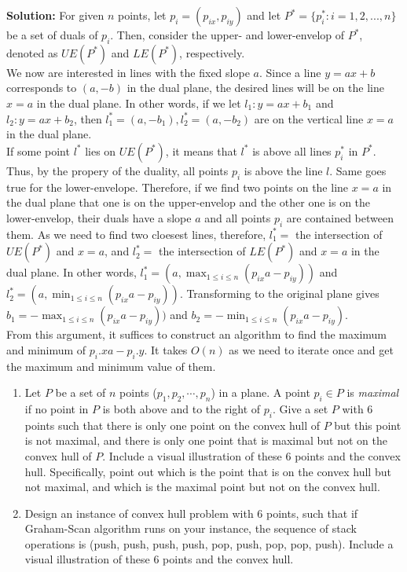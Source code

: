\documentclass[11pt]{article}
\begin{document}
\begin{qunlist}
{\bf Solution:} For given $n$ points, let $p_i = (p_{ix}, p_{iy})$ and let $P^* =
\{p_i^* : i = 1, 2, ..., n\}$ be a set of duals of $p_i$. Then, consider the
upper- and lower-envelop of $P^*$, denoted as $UE(P^*)$ and $LE(P^*)$,
	respectively. \\ We now are interested in lines with the fixed slope $a$.
	Since a line $y = ax + b$ corresponds to $(a, -b)$ in the dual plane, the
	desired lines will be on the line $x = a$ in the dual plane. In other
	words, if we let $l_1 : y = ax + b_1$ and $l_2 : y = ax + b_2$, then $l_1^*
	= (a, -b_1), l_2^* = (a, -b_2)$ are on the vertical line $x = a$ in the
	dual plane.\\ If some point $l^*$ lies on $UE(P^*)$, it means that $l^*$ is
	above all lines $p_i^*$ in $P^*$. Thus, by the propery of the duality, all
	points $p_i$ is above the line $l$. Same goes true for the lower-envelope.
	Therefore, if we find two points on the line $x=a$ in the dual plane that
	one is on the upper-envelop and the other one is on the lower-envelop,
	their duals have a slope $a$ and all points $p_i$ are contained between
	them. As we need to find two cloesest lines, therefore, $l_1^* =$ the
	intersection of $UE(P^*)$ and $x=a$, and $l_2^* =$ the intersection of
	$LE(P^*)$ and $x=a$ in the dual plane. In other words, $l_1^* = (a,
			\max_{1\leq i \leq n}(p_{ix} a - p_{iy}))$ and $l_2^* = (a,
			\min_{1\leq i \leq n}(p_{ix} a - p_{iy}))$. Transforming to the
			original plane gives $b_1 = -\max_{1\leq i \leq n}(p_{ix} a -
					p_{iy}))$ and $b_2 = -\min_{1\leq i \leq n}(p_{ix} a -
					p_{iy})$.\\ From this argument, it suffices to construct an
					algorithm to find the maximum and minimum of $p_i.x a -
					p_i.y$. It takes $O(n)$ as we need to iterate once and get
					the maximum and minimum value of them.

\begin{enumerate}
\item Let $P$ be a set of $n$ points ($p_1, p_2, \cdots, p_n$) in a plane. A point
$p_i \in P$ is \emph{maximal} if no point in $P$ is both above and to the right
of $p_i$. Give a set $P$ with 6 points such that there is only one point on the convex hull
of $P$ but this point is not maximal, and there is only one point that is maximal but not on the convex hull of $P$.
Include a visual illustration of these 6 points and the convex hull.  
Specifically, point out which is the point that is on the convex hull but not maximal, and which
is the maximal point but not on the convex hull.
\item Design an instance of convex hull problem with 6 points, such that if
Graham-Scan algorithm runs on your instance, the sequence of stack operations
is (push, push, push, push, pop, push, pop, pop, push).
Include a visual illustration of these 6 points and the convex hull.  
\end{enumerate}


\end{qunlist}
\end{document}
